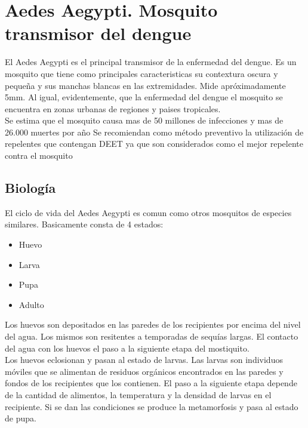 
\section{Aedes Aegypti. Mosquito transmisor del dengue}
\label{sec:caracteristicas-biologicas}
El Aedes Aegypti  es el principal transmisor de la enfermedad del dengue. Es un mosquito que tiene como principales caracteristicas su contextura oscura y pequeña y sus manchas blancas en las extremidades. Mide apróximadamente 5mm. Al igual, evidentemente, que la enfermedad del dengue el mosquito se encuentra en zonas urbanas de regiones y paises tropicales.\\

Se estima que el mosquito causa mas de 50 millones de infecciones y mas de 26.000 muertes por año
Se recomiendan como método preventivo la utilización de repelentes que contengan DEET ya que son considerados como el mejor repelente contra el mosquito\\

\subsection{Biología}

El ciclo de vida del Aedes Aegypti es comun como otros mosquitos de especies similares. Basicamente consta de 4 estados:\\
\begin{itemize}
\item Huevo
\item Larva
\item Pupa
\item Adulto\\
\end{itemize}

Los huevos son depositados en las paredes de los recipientes por encima del nivel del agua. Los mismos son resitentes a temporadas de sequías largas. El contacto del agua con los huevos el paso a la siguiente etapa del mostiquito.\\

Los huevos eclosionan y pasan al estado de larvas. Las larvas son individuos móviles que se alimentan de residuos orgánicos encontrados en las paredes y fondos de los recipientes que los contienen. El paso a la siguiente etapa depende de la cantidad de alimentos, la temperatura y la densidad de larvas en el recipiente. Si se dan las condiciones se produce la metamorfosis y pasa al estado de pupa.\\


